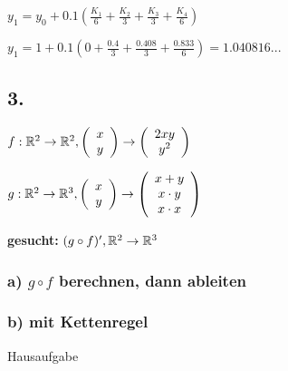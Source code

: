 $ y_1 = y_0 + 0.1 (\frac{K_1}{6} + \frac{K_2}{3} + \frac{K_3}{3} + \frac{K_4}{6}) $ 

$ y_1 = 1 + 0.1 (0 + \frac{0.4}{3} + \frac{0.408}{3} + \frac{0.833}{6}) = 1.040816 ... $ 

\subsection{3.}
$ f: \mathbb{R}^2 \rightarrow \mathbb{R}^2,   \left(  \begin{array}{c} x\\y \end{array}  \right)   \rightarrow   \left(  \begin{array}{c} 2xy\\y^2 \end{array}  \right)  $

$ g: \mathbb{R}^2 \rightarrow \mathbb{R}^3,   \left(  \begin{array}{c} x\\y \end{array}  \right)   \rightarrow   \left(  \begin{array}{c} x+y\\x\cdot y\\x\cdot x \end{array}  \right)  $

\textbf{gesucht:} $(g\circ f)', \mathbb{R}^2 \rightarrow \mathbb{R}^3$
\subsubsection{a) $g\circ f$ berechnen, dann ableiten}

\subsubsection{b) mit Kettenregel}

Hausaufgabe